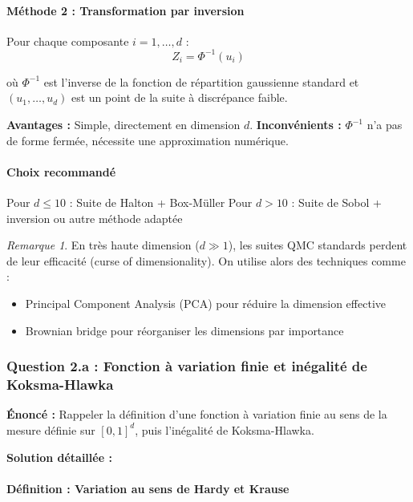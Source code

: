 \documentclass[12pt,a4paper]{article}
\theoremstyle{definition}
\theoremstyle{remark}
\newtheorem*{remark}{Remarque}
\begin{document}
\paragraph{Méthode 2 : Transformation par inversion}

Pour chaque composante $i = 1, \ldots, d$ :
\[
Z_i = \Phi^{-1}(u_i)
\]

où $\Phi^{-1}$ est l'inverse de la fonction de répartition gaussienne standard et $(u_1, \ldots, u_d)$ est un point de la suite à discrépance faible.

\textbf{Avantages :} Simple, directement en dimension $d$.
\textbf{Inconvénients :} $\Phi^{-1}$ n'a pas de forme fermée, nécessite une approximation numérique.

\paragraph{Choix recommandé}

Pour $d \leq 10$ : Suite de Halton + Box-Müller
Pour $d > 10$ : Suite de Sobol + inversion ou autre méthode adaptée

\begin{remark}
En très haute dimension ($d \gg 1$), les suites QMC standards perdent de leur efficacité (curse of dimensionality). On utilise alors des techniques comme :
\begin{itemize}
\item Principal Component Analysis (PCA) pour réduire la dimension effective
\item Brownian bridge pour réorganiser les dimensions par importance
\end{itemize}
\end{remark}

\subsubsection{Question 2.a : Fonction à variation finie et inégalité de Koksma-Hlawka}

\textbf{Énoncé :} Rappeler la définition d'une fonction à variation finie au sens de la mesure définie sur $[0,1]^d$, puis l'inégalité de Koksma-Hlawka.

\textbf{Solution détaillée :}

\paragraph{Définition : Variation au sens de Hardy et Krause}
\end{document}
